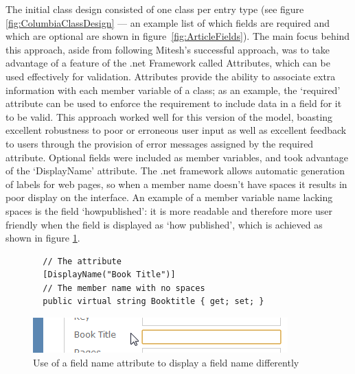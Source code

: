 The initial class design consisted of one class per entry type (see figure \ref{fig:ColumbiaClassDesign} --- an example list of which fields are required and which are optional are shown in figure~\ref{fig:ArticleFields}).  The main focus behind this approach, aside from following Mitesh's successful approach, was to take advantage of a feature of the .\gls{net} Framework called Attributes, which can be used effectively for validation.  Attributes provide the ability to associate extra information with each member variable of a class; as an example, the `required' attribute can be used to enforce the requirement to include data in a field for it to be valid.  This approach worked well for this version of the model, boasting excellent robustness to poor or erroneous user input as well as excellent feedback to users through the provision of error messages assigned by the required attribute.  Optional fields were included as member variables, and took advantage of the `DisplayName' attribute. The .\gls{net} framework allows automatic generation of labels for web pages, so when a member name doesn't have spaces it results in poor display on the interface.  An example of a member variable name lacking spaces is the field `howpublished': it is more readable and therefore more user friendly when the field is displayed as `how published', which is achieved as shown in figure \ref{fig:displayName}.

\begin{figure}
	\begin{center}
			\lstset{language=CSharp} 
			\begin{lstlisting}
  // The attribute
  [DisplayName("Book Title")]
  // The member name with no spaces
  public virtual string Booktitle { get; set; }
			\end{lstlisting}
		\includegraphics{images/displayNameOnInterface.png}
		\caption{Use of a field name attribute to display a field name differently}
		\label{fig:displayName}
	\end{center}
\end{figure}

